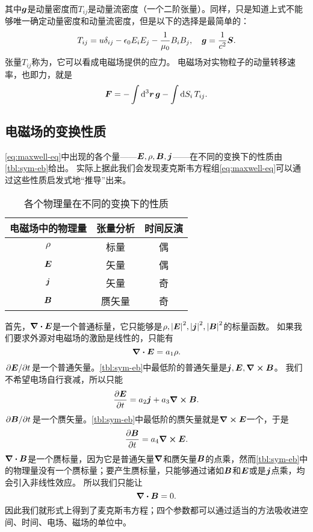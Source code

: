其中$\vb*{g}$是动量密度而$T_{ij}$是动量流密度（一个二阶张量）。同样，只是知道上式不能够唯一确定动量密度和动量流密度，但是以下的选择是最简单的：
\begin{equation}
    T_{ij} = u \delta_{ij} - \epsilon_0 E_i E_j - \frac{1}{\mu_0} B_i B_j, \quad \vb*{g} = \frac{1}{c^2} \vb*{S}.
\end{equation}
张量$T_{ij}$称为，它可以看成电磁场提供的应力。
电磁场对实物粒子的动量转移速率，也即力，就是
\begin{equation}
    \vb*{F} = - \int \dd[3]{\vb*{r}} \vb*{g} - \int \dd{S_i} T_{ij}.
\end{equation}

\subsection{电磁场的变换性质}\label{sec:e-m-field-transformation-feature-vacuum}

\eqref{eq:maxwell-eq}中出现的各个量——$\vb*{E}, \rho, \vb*{B}, \vb*{j}$——在不同的变换下的性质由\autoref{tbl:sym-eb}给出。
实际上据此我们会发现麦克斯韦方程组\eqref{eq:maxwell-eq}可以通过这些性质启发式地“推导”出来。

\begin{table}
    \centering
    \caption{各个物理量在不同的变换下的性质}
    \label{tbl:sym-eb}
    \begin{tabular}[c]{ccc}
        \toprule
        电磁场中的物理量 & 张量分析 & 时间反演 \\
        \midrule
        $\rho$ & 标量 & 偶 \\
        $\vb*{E}$ & 矢量 & 偶 \\
        $\vb*{j}$ & 矢量 & 奇 \\
        $\vb*{B}$ & 赝矢量 & 奇 \\
        \bottomrule
    \end{tabular}
\end{table}

首先，$\div{\vb*{E}}$是一个普通标量，它只能够是$\rho, \abs{\vb*{E}}^2, \abs{\vb*{j}}^2, \abs{\vb*{B}}^2$的标量函数。
如果我们要求外源对电磁场的激励是线性的，只能有
\[
    \div{\vb*{E}} = a_1 \rho.
\]
$\pdv*{\vb*{E}}{t}$是一个普通矢量。\autoref{tbl:sym-eb}中最低阶的普通矢量是$\vb*{j}, \vb*{E}, \curl{\vb*{B}}$。
我们不希望电场自行衰减，所以只能
\[
    \pdv{\vb*{E}}{t} = a_2 \vb*{j} + a_3 \curl{\vb*{B}}.
\]
$\pdv*{\vb*{B}}{t}$是一个赝矢量。\autoref{tbl:sym-eb}中最低阶的赝矢量就是$\curl{\vb*{E}}$一个，于是
\[
    \pdv{\vb*{B}}{t} = a_4 \curl{\vb*{E}}.
\]
$\div{\vb*{B}}$是一个赝标量，因为它是普通矢量$\grad$和赝矢量$\vb*{B}$的点乘，然而\autoref{tbl:sym-eb}中的物理量没有一个赝标量；要产生赝标量，只能够通过诸如$\vb*{B}$和$\vb*{E}$或是$\vb*{j}$点乘，均会引入非线性效应。
所以我们只能让
\[
    \div{\vb*{B}} = 0.
\]
因此我们就形式上得到了麦克斯韦方程；四个参数都可以通过适当的方法吸收进空间、时间、电场、磁场的单位中。

